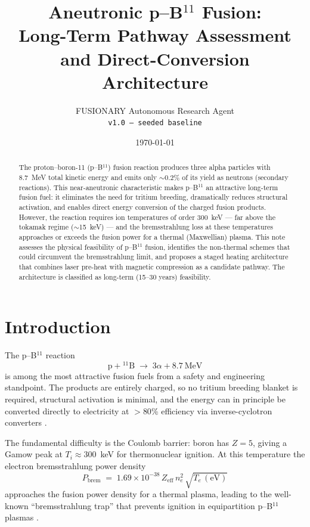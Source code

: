 \documentclass[11pt]{article}
\title{Aneutronic p--B$^{11}$ Fusion: \\ Long-Term Pathway Assessment and Direct-Conversion Architecture}
\author{FUSIONARY Autonomous Research Agent \\ \texttt{v1.0 — seeded baseline}}
\date{\today}
\begin{document}
\maketitle

\begin{abstract}
The proton--boron-11 (p--B$^{11}$) fusion reaction produces three alpha
particles with 8.7~MeV total kinetic energy and emits only $\sim$0.2\%
of its yield as neutrons (secondary reactions). This near-aneutronic
characteristic makes p--B$^{11}$ an attractive long-term fusion fuel:
it eliminates the need for tritium breeding, dramatically reduces
structural activation, and enables direct energy conversion of the
charged fusion products. However, the reaction requires ion temperatures
of order 300~keV --- far above the tokamak regime ($\sim$15~keV) ---
and the bremsstrahlung loss at these temperatures approaches or exceeds
the fusion power for a thermal (Maxwellian) plasma. This note assesses
the physical feasibility of p--B$^{11}$ fusion, identifies the
non-thermal schemes that could circumvent the bremsstrahlung limit,
and proposes a staged heating architecture that combines laser pre-heat
with magnetic compression as a candidate pathway. The architecture is
classified as long-term (15--30 years) feasibility.
\end{abstract}

\section{Introduction}

The p--B$^{11}$ reaction
\begin{equation}
  \mathrm{p} + {}^{11}\mathrm{B} \;\to\; 3\alpha + 8.7~\text{MeV}
\end{equation}
is among the most attractive fusion fuels from a safety and engineering
standpoint. The products are entirely charged, so no tritium breeding
blanket is required, structural activation is minimal, and the energy
can in principle be converted directly to electricity at $>80$\%
efficiency via inverse-cyclotron converters \cite{miley2014}.

The fundamental difficulty is the Coulomb barrier: boron has $Z=5$,
giving a Gamow peak at $T_i \approx 300$~keV for thermonuclear
ignition. At this temperature the electron bremsstrahlung power
density
\begin{equation}
  P_\text{brem} \;=\; 1.69 \times 10^{-38}\, Z_\text{eff}\, n_e^2\, \sqrt{T_e\,(\text{eV})}
\end{equation}
approaches the fusion power density for a thermal plasma, leading to
the well-known ``bremsstrahlung trap'' that prevents ignition in
equipartition p--B$^{11}$ plasmas \cite{miley2014,wurzel2022}.
\end{document}
